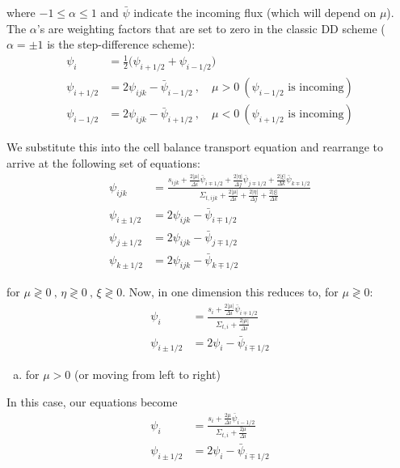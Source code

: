 \documentclass[10pt]{article}
\begin{document}
where $-1 \leq \alpha \leq 1$ and $\bar{\psi}$ indicate the incoming flux (which will depend on $\mu$). The $\alpha$'s are weighting factors that are set to zero in the classic DD scheme ($\alpha = \pm 1$ is the step-difference scheme):
%
\begin{align*}
\psi_{i} &= \frac{1}{2}\bigl(\psi_{i+1/2}+\psi_{i-1/2}\bigr)\\
\psi_{i+1/2} &= 2\psi_{ijk} - \bar{\psi}_{i-1/2}\:,\quad \mu>0\:(\psi_{i-1/2}\text{ is incoming})\\
\psi_{i-1/2} &= 2\psi_{ijk} - \bar{\psi}_{i+1/2}\:,\quad \mu<0 \:(\psi_{i+1/2}\text{ is incoming})
\end{align*}

We substitute this into the cell balance transport equation and rearrange to arrive at the following set of equations:
%
\begin{align*}
    \psi_{ijk} &= \frac{s_{ijk} +
      \frac{2|\mu|}{\Delta i}\bar{\psi}_{i\mp1/2} +
      \frac{2|\eta|}{\Delta j}\bar{\psi}_{j\mp1/2} +
      \frac{2|\xi|}{\Delta k}\bar{\psi}_{k\mp1/2}}{
      \Sigma_{t,ijk} + \frac{2|\mu|}{\Delta i} +
      \frac{2|\eta|}{\Delta j} +
      \frac{2|\xi|}{\Delta k} }\\
    \psi_{i\pm1/2} &= 2\psi_{ijk} - \bar{\psi}_{i\mp1/2}\\
    \psi_{j\pm1/2} &= 2\psi_{ijk} - \bar{\psi}_{j\mp1/2}\\
    \psi_{k\pm1/2} &= 2\psi_{ijk} - \bar{\psi}_{k\mp1/2}
\end{align*}

for $\mu\gtrless0\:,\,\eta\gtrless0\:,\,\xi\gtrless0$. Now, in one dimension this reduces to, for $\mu\gtrless0$:
%
\begin{align*}
    \psi_{i} &= \frac{s_{i} + \frac{2|\mu|}{\Delta i}\bar{\psi}_{i\mp1/2}}{\Sigma_{t,i} + \frac{2|\mu|}{\Delta i}} \\
    \psi_{i\pm1/2} &= 2\psi_{i} - \bar{\psi}_{i\mp1/2}
\end{align*}

%
%
%

\vspace{10pt}
\begin{enumerate}[(a)]
\item for $\mu > 0$ (or moving from left to right)
\end{enumerate}

In this case, our equations become
%
\begin{align*}
\psi_{i} &= \frac{s_{i} + \frac{2\mu}{\Delta i}\bar{\psi}_{i-1/2}}{\Sigma_{t,i} + \frac{2\mu}{\Delta i}} \\
\psi_{i\pm1/2} &= 2\psi_{i} - \bar{\psi}_{i\mp1/2}
\end{align*}
\end{document}
